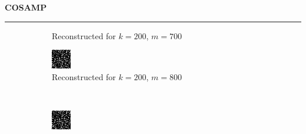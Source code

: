 \documentclass[a4paper,12pt]{article}
\newenvironment{solution}[2][]{%
    \begin{mdframed}[linecolor=blue!70!black, linewidth=2pt, roundcorner=10pt, backgroundcolor=yellow!10!white, skipabove=12pt, skipbelow=12pt]%
        \textbf{\large #2}
        \par\noindent\rule{\textwidth}{0.4pt}
}{
    \end{mdframed}
}
\begin{document}
\begin{solution}{COSAMP}
\begin{figure}[H]
\begin{subfigure}[t]{0.23\textwidth}
            \caption{Reconstructed for $k = 200$, $m = 700$}
        \end{subfigure}
        \begin{subfigure}[t]{0.23\textwidth}
            \centering
            \includegraphics[width=\textwidth]{../images/cosamp/Reconstructed_k_200_m_800.png}
            \caption{Reconstructed for $k = 200$, $m = 800$}
        \end{subfigure}\\
        \begin{subfigure}[t]{0.23\textwidth}
            \centering
            \includegraphics[width=\textwidth]{../images/cosamp/Reconstructed_k_200_m_900.png}

\end{subfigure}
\end{figure}
\end{solution}
\end{document}
